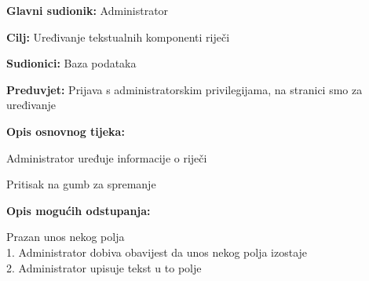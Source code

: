 					\noindent {}
					\begin{packed_item}
						\item \textbf{Glavni sudionik:} Administrator
						\item \textbf{Cilj:} Uređivanje tekstualnih komponenti riječi
						\item \textbf{Sudionici:} Baza podataka
						\item \textbf{Preduvjet:} Prijava s administratorskim privilegijama, na stranici smo za uređivanje
						\item \textbf{Opis osnovnog tijeka:}
						\begin{packed_enum}
							\item Administrator uređuje informacije o riječi
							\item Pritisak na gumb za spremanje
						\end{packed_enum}
						\item \textbf{Opis mogućih odstupanja:}
						\begin{packed_item}
							\item [2.a] Prazan unos nekog polja
							\\1. Administrator dobiva obavijest da unos nekog polja izostaje
							\\2. Administrator upisuje tekst u to polje
						\end{packed_item}
					\end{packed_item}
					
